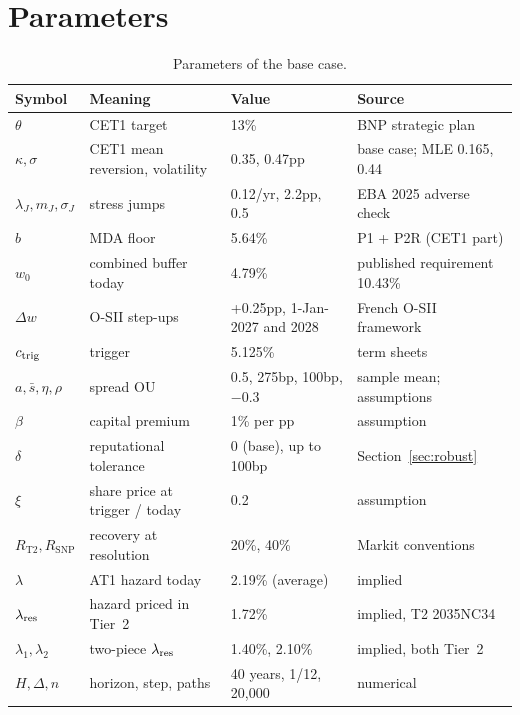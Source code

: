 \section{Parameters}\label{app:params}

\begin{table}[H]
\centering\small
\begin{tabular}{llll}
\toprule
Symbol & Meaning & Value & Source \\
\midrule
$\theta$ & CET1 target & 13\% & BNP strategic plan \\
$\kappa,\sigma$ & CET1 mean reversion, volatility & 0.35, 0.47pp & base case; MLE 0.165, 0.44 \\
$\lambda_J,m_J,\sigma_J$ & stress jumps & 0.12/yr, 2.2pp, 0.5 & EBA 2025 adverse check \\
$b$ & MDA floor & 5.64\% & P1 + P2R (CET1 part) \\
$w_0$ & combined buffer today & 4.79\% & published requirement 10.43\% \\
$\Delta w$ & O-SII step-ups & +0.25pp, 1-Jan-2027 and 2028 & French O-SII framework \\
$c_{\mathrm{trig}}$ & trigger & 5.125\% & term sheets \\
$a,\bar s,\eta,\rho$ & spread OU & 0.5, 275bp, 100bp, $-0.3$ & sample mean; assumptions \\
$\beta$ & capital premium & 1\% per pp & assumption \\
$\delta$ & reputational tolerance & 0 (base), up to 100bp & Section~\ref{sec:robust} \\
$\xi$ & share price at trigger / today & 0.2 & assumption \\
$R_{\mathrm{T2}},R_{\mathrm{SNP}}$ & recovery at resolution & 20\%, 40\% & Markit conventions \\
$\lambda$ & AT1 hazard today & 2.19\% (average) & implied \\
$\lambda_{\mathrm{res}}$ & hazard priced in Tier~2 & 1.72\% & implied, T2 2035NC34 \\
$\lambda_1,\lambda_2$ & two-piece $\lambda_{\mathrm{res}}$ & 1.40\%, 2.10\% & implied, both Tier~2 \\
$H,\Delta,n$ & horizon, step, paths & 40 years, 1/12, 20,000 & numerical \\
\bottomrule
\end{tabular}
\caption{Parameters of the base case.}
\end{table}

